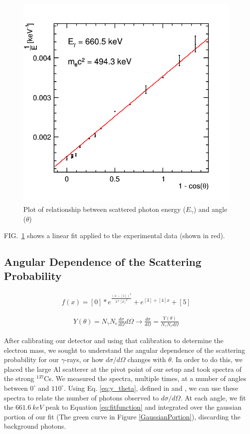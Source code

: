 \documentclass[%
 reprint,
 amsmath,amssymb,
 aps,
 pra,
]{revtex4-1}
\begin{document}
\begin{figure}[H]
\centering	
	\includegraphics[scale=0.34]{EScatvTheta.png}
	\caption{Plot of relationship between scattered photon energy ($E_\gamma$) and angle ($\theta$)}
	\label{Fig:EScatFit}
\end{figure}

FIG.~\ref{Fig:EScatFit} shows a linear fit applied to the experimental data (shown in red). 

\subsection{Angular Dependence of the Scattering Probability}

\begin{gather}\label{eq:fitfunction}
	f(x) = [0]*e^{\frac{(x-[1])^2}{2*[2]^2}} + e^{[3]+[4]x} + [5]
\end{gather}

\begin{gather}\label{eq:y_theta}
	Y(\theta) = N_\gamma N_e \frac{d\sigma}{d\Omega}d\Omega \rightarrow \frac{d\sigma}{d\Omega} = \frac{Y(\theta)}{N_\gamma N_e d\Omega}
\end{gather}

After calibrating our detector and using that calibration to determine the electron mass, we sought to understand the angular dependence of the scattering probability for our $\gamma$-rays, or how $d \sigma / d \Omega$ changes with $\theta$. In order to do this, we placed the large Al scatterer at the pivot point of our setup and took spectra of the strong $^{137}$Cs. We measured the spectra, multiple times, at a number of angles between $0^{\circ}$ and $110^{\circ}$. Using Eq. \ref{eq:y_theta}, defined in \cite{milissinos} and \cite{manual}, we can use these spectra to relate the number of photons observed to $d\sigma / d\Omega$. At each angle, we fit the $661.6~keV$ peak to Equation \ref{eq:fitfunction} and integrated over the gaussian portion of our fit (The green curve in Figure \ref{GaussianPortion}), discarding the background photons.
\end{document}
